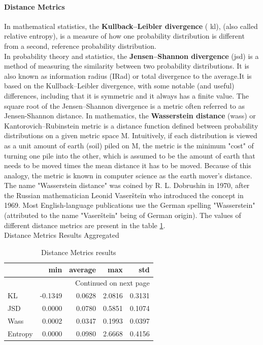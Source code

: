 \documentclass{article}
\begin{document}
\paragraph{Distance Metrics}
In mathematical statistics, the \textbf{Kullback–Leibler divergence} ( \acrshort{kl}),  (also called relative entropy), is a measure of how one probability distribution is different from a second, reference probability distribution.\\
In probability theory and statistics, the \textbf{Jensen–Shannon divergence} (\acrshort{jsd}) is a method of measuring the similarity between two probability distributions. It is also known as information radius (IRad) or total divergence to the average.It is based on the Kullback–Leibler divergence, with some notable (and useful) differences, including that it is symmetric and it always has a finite value. The square root of the Jensen–Shannon divergence is a metric often referred to as Jensen-Shannon distance.     
In mathematics, the \textbf{Wasserstein distance} (\acrshort{wass}) or Kantorovich–Rubinstein metric is a distance function defined between probability distributions on a given metric space M.
Intuitively, if each distribution is viewed as a unit amount of earth (soil) piled on M, the metric is the minimum "cost" of turning one pile into the other, which is assumed to be the amount of earth that needs to be moved times the mean distance it has to be moved. Because of this analogy, the metric is known in computer science as the earth mover's distance.
The name "Wasserstein distance" was coined by R. L. Dobrushin in 1970, after the Russian mathematician Leonid Vaseršteĭn who introduced the concept in 1969. Most English-language publications use the German spelling "Wasserstein" (attributed to the name "Vaseršteĭn" being of German origin). The values of different distance metrics are present in the table \ref{tab:distance}.\\

\caption{Distance Metrics Results Aggregated}\label{tab:distance}   
\begin{longtable}{lrrrr}
\caption{Distance Metrics results}\label{tab:distance}\\
\toprule
{} &     min &  average &    max &    std \\
\midrule
\endhead
\midrule
\multicolumn{5}{r}{{Continued on next page}} \\
\midrule
\endfoot

\bottomrule
\endlastfoot
KL      & -0.1349 &   0.0628 & 2.0816 & 0.3131 \\
JSD     &  0.0000 &   0.0780 & 0.5851 & 0.1074 \\
Wass    &  0.0002 &   0.0347 & 0.1993 & 0.0397 \\
Entropy &  0.0000 &   0.0980 & 2.6668 & 0.4156 \\
\end{longtable}
\end{document}
